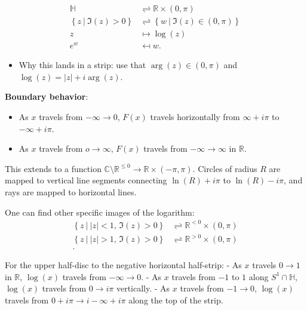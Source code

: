 \begin{proposition}

\begin{align*}
{\mathbb{H}}&\rightleftharpoons{\mathbb{R}}\times(0, \pi) \\
\left\{{ z {~\mathrel{\Big|}~}\Im(z) > 0 }\right\} &\rightleftharpoons\left\{{ w {~\mathrel{\Big|}~}\Im(z) \in (0, \pi ) }\right\} \\
z &\mapsto \log(z) \\
e^w &\mapsfrom w
.\end{align*}

\begin{itemize}
\tightlist
\item
  Why this lands in a strip: use that \(\arg(z) \in (0, \pi)\) and
  \(\log(z) = {\left\lvert {z} \right\rvert} + i\arg(z)\).
\end{itemize}

\textbf{Boundary behavior}:

\begin{itemize}
\tightlist
\item
  As \(x\) travels from \(-\infty \to 0\), \(F(x)\) travels horizontally
  from \(\infty + i\pi\) to \(-\infty + i\pi\).
\item
  As \(x\) travels from \(o\to \infty\), \(F(x)\) travels from
  \(-\infty\to\infty\) in \({\mathbb{R}}\).
\end{itemize}

\end{proposition}

\begin{remark}

This extends to a function
\({\mathbb{C}}\setminus{\mathbb{R}}^{\leq 0} \to {\mathbb{R}}\times(-\pi, \pi)\).
Circles of radius \(R\) are mapped to vertical line segments connecting
\(\ln(R) + i\pi\) to \(\ln(R) - i\pi\), and rays are mapped to
horizontal lines.

\end{remark}

\begin{remark}

One can find other specific images of the logarithm:
\begin{align*}
\left\{{ z {~\mathrel{\Big|}~}{\left\lvert {z} \right\rvert} < 1,\, \Im(z) > 0 }\right\} &\rightleftharpoons{\mathbb{R}}^{<0} \times(0, \pi ) \\
\left\{{ z {~\mathrel{\Big|}~}{\left\lvert {z} \right\rvert} > 1,\, \Im(z) > 0 }\right\} &\rightleftharpoons{\mathbb{R}}^{>0} \times(0, \pi ) \\
.\end{align*}

For the upper half-disc to the negative horizontal half-strip: - As
\(x\) travels \(0\to 1\) in \({\mathbb{R}}\), \(\log(x)\) travels from
\(-\infty\to 0\). - As \(x\) travels from \(-1\) to \(1\) along
\(S^1\cap{\mathbb{H}}\), \(\log(x)\) travels from \(0\to i\pi\)
vertically. - As \(x\) travels from \(-1\to 0\), \(\log(x)\) travels
from \(0+i\pi\to i-\infty+i\pi\) along the top of the strip.

\end{remark}

